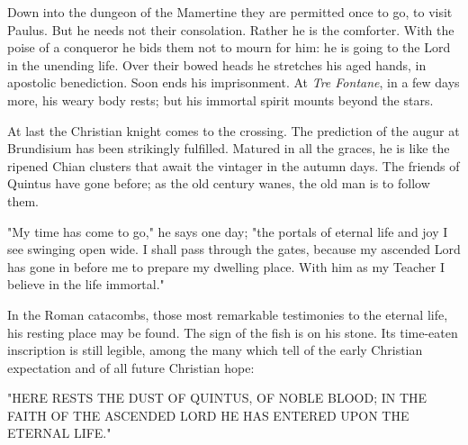 Down into the dungeon of the Mamertine they are permitted once to
go, to visit Paulus.  But he needs not their consolation.  Rather
he is the comforter.  With the poise of a conqueror he bids them
not to mourn for him: he is going to the Lord in the unending life.
Over their bowed heads he stretches his aged hands, in apostolic
benediction.  Soon ends his imprisonment.  At \textit{Tre Fontane}, in a
few days more, his weary body rests; but his immortal spirit mounts
beyond the stars.

At last the Christian knight comes to the crossing.  The prediction
of the augur at Brundisium has been strikingly fulfilled.  Matured
in all the graces, he is like the ripened Chian clusters that await
the vintager in the autumn days.  The friends of Quintus have gone
before; as the old century wanes, the old man is to follow them.

"My time has come to go," he says one day; "the portals of eternal
life and joy I see swinging open wide.  I shall pass through the
gates, because my ascended Lord has gone in before me to prepare my
dwelling place.  With him as my Teacher I believe in the life
immortal."


In the Roman catacombs, those most remarkable testimonies to the
eternal life, his resting place may be found.  The sign of the fish
is on his stone.  Its time-eaten inscription is still legible,
among the many which tell of the early Christian expectation and of
all future Christian hope:


"HERE RESTS THE DUST OF QUINTUS, OF NOBLE BLOOD; IN THE FAITH OF
THE ASCENDED LORD HE HAS ENTERED UPON THE ETERNAL LIFE."
